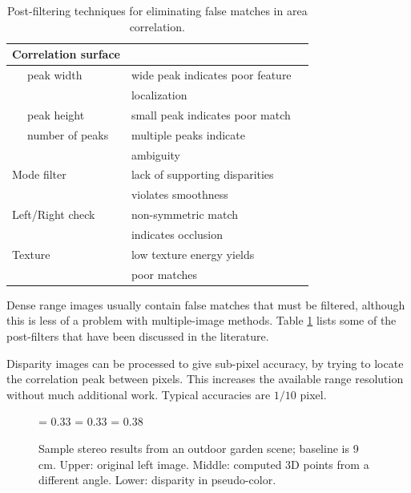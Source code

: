 \documentclass[twocolumn,oneside]{book}
\begin{document}
\begin{table}
\begin{tabular}{|p{1.2in}p{2in}|l|}
\hline
Correlation surface  & \cite{matthies93}\\
\hline
\verb+  + peak width & wide peak indicates poor feature\\
 & localization \\
\verb+  + peak height & small peak indicates poor match \\
\verb+  + number of peaks  & multiple peaks indicate\\
& ambiguity \\
\hline
Mode filter  & lack of supporting disparities \\
&violates smoothness \\	
\hline
Left/Right check  & non-symmetric match\\
\cite{bolles93,fua93}& indicates occlusion \\
\hline
Texture \cite{moravec79}  & low texture energy yields\\
&poor matches \\
\hline
\end{tabular}

\caption{
Post-filtering techniques for eliminating false matches in area
correlation. 
\label{tab23.post-filter}}


\end{table}

Dense range images usually contain false matches that must be
filtered, although this is less of a problem with multiple-image
methods.  Table \ref{tab23.post-filter} lists some of the post-filters
that have been discussed in the literature. 

Disparity images can be processed to give sub-pixel
accuracy, by trying to locate the correlation peak between pixels.
This increases the available range resolution without much additional
work.  Typical accuracies are $1/10$ pixel.

\begin{figure}

{\epsfxsize = 0.33\textwidth {}}
{\epsfxsize = 0.33\textwidth {}}
{\epsfxsize = 0.38\textwidth {}}

\caption{
Sample stereo results from an outdoor garden scene; baseline is 9 cm.
Upper: original left image.  Middle: computed 3D points from a
different angle.  Lower: disparity in pseudo-color.
\label{fig23.garden-results}}

\end{figure}
\end{document}
